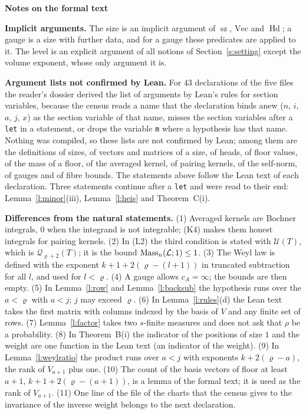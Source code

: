 \documentclass[11pt,a4paper]{article}
\newcommand{\m}[1]{\mbox{$#1$}}        %
\newcommand{\sect}[2]{\refstepcounter{section}\label{#2}\par\addvspace{19pt plus 4pt minus 2pt}\Needspace{7\baselineskip}%
  \noindent\llap{{\fontsize{13.2}{16}\selectfont\bfseries\color{inkfaint}\thesection}\hspace{9pt}}%
  {\fontsize{13.2}{16}\selectfont\bfseries\color{ink}#1}\par\nopagebreak\vspace{-1pt}}
\theoremstyle{plainx}
\theoremstyle{uprightx}
\newcommand{\cL}{\mathcal{L}}
\newcommand{\Ql}[2]{\mathcal{Q}_{#1}(#2)}
\newcommand{\UT}[1]{\mathcal{U}(#1)}
\begin{document}
\sect{Notes on the formal text}{s:notes}
\textbf{Implicit arguments.} The size is an implicit argument of $\operatorname{sz}$, $\mathrm{Vec}$ and
$\operatorname{Hd}$; a gauge is a size with further data, and for a gauge these predicates are applied to it. The
level is an explicit argument of all notions of Section~\ref{s:setting} except the volume exponent, whose only
argument it is.

\textbf{Argument lists not confirmed by Lean.} For 43 declarations of the five files the reader's dossier derived the
list of arguments by Lean's rules for section variables, because the census reads a name that the declaration binds
anew ($n$, $i$, $a$, $j$, $x$) as the section variable of that name, misses the section variables after a
\texttt{let} in a statement, or drops the variable \texttt{m} where a hypothesis has that name. Nothing was compiled,
so these lists are not confirmed by Lean; among them are the definitions of sizes, of vectors and matrices of a
size, of heads, of floor values, of the mass of a floor, of the averaged kernel, of pairing kernels, of the
self-norm, of gauges and of fibre bounds. The statements above follow the Lean text of each declaration. Three
statements continue after a \texttt{let} and were read to their end: Lemma~\ref{l:minor}(iii),
Lemma~\ref{l:heis} and Theorem~C(i).

\textbf{Differences from the natural statements.} (1) Averaged kernels are Bochner integrals, $0$ when the
integrand is not integrable; (K4) makes them honest integrals for pairing kernels. (2) In (L2) the third condition
is stated with $\UT{T}$, which is $\Ql{\varrho+2}{T}$; it is the bound \m{\FloorMassLe{\cL}{n}{1}{1}}. (3) The Weyl
law is defined with the exponent $k+1+2(\varrho-(l+1))$ in truncated subtraction for all $l$, and used for
$l<\varrho$. (4) A gauge allows $c_A=\infty$; the bounds are then empty. (5) In Lemma~\ref{l:row} and
Lemma~\ref{l:backsub} the hypothesis runs over the $a<\varrho$ with $a<j$; $j$ may exceed $\varrho$. (6) In
Lemma~\ref{l:rules}(d) the Lean text takes the first matrix with columns indexed by the basis of $V$ and any finite
set of rows. (7) Lemma~\ref{l:factor} takes two $s$-finite measures and does not ask that $\rho$ be a probability.
(8) In Theorem~B(i) the indicator of the positions of size $1$ and the weight are one function in the Lean text
(an indicator of the weight). (9) In Lemma~\ref{l:weylratio} the product runs over $a<j$ with exponents
$k+2(\varrho-a)$, the rank of $V_{a+1}$ plus one. (10) The count of the basis vectors of floor at least $a+1$,
$k+1+2(\varrho-(a+1))$, is a lemma of the formal text; it is used as the rank of $V_{a+1}$. (11) One line of the
file of the charts that the census gives to the invariance of the inverse weight belongs to the next declaration.
\end{document}

